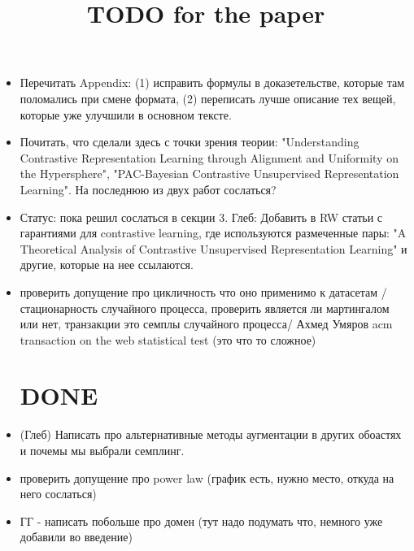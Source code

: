 \documentclass{article}
\title{TODO for the paper}
\author{}
\begin{document}
\maketitle

\begin{itemize}

\section{TODO}

\item Перечитать Appendix: (1) исправить формулы в доказетельстве, которые там поломались при смене формата, (2) переписать лучше описание тех вещей, которые уже улучшили в основном тексте.

\item Почитать, что сделали здесь с точки зрения теории: "Understanding Contrastive Representation Learning through Alignment and Uniformity on the Hypersphere", "PAC-Bayesian Contrastive Unsupervised Representation Learning". На последнюю из двух работ сослаться?

\item Статус:  пока решил сослаться в секции 3. Глеб: Добавить в RW статьи с гарантиями для contrastive learning, где используются размеченные пары: "A Theoretical Analysis of Contrastive Unsupervised Representation Learning" и другие, которые на нее ссылаются.


\item проверить допущение про цикличность что оно применимо к датасетам / стационарность случайного процесса, проверить является ли мартингалом или нет, транзакции это семплы случайного процесса/ Ахмед Умяров  acm transaction on the web statistical test (это что то сложное)

\section{DONE}

\item (Глеб) Написать про альтернативные методы аугментации в других обоастях и почемы мы выбрали семплинг.

\item проверить допущение про power law (график есть, нужно место, откуда на него сослаться)


\item ГГ - написать побольше про домен (тут надо подумать что, немного уже добавили во введение)



\end{itemize}
\end{document}
